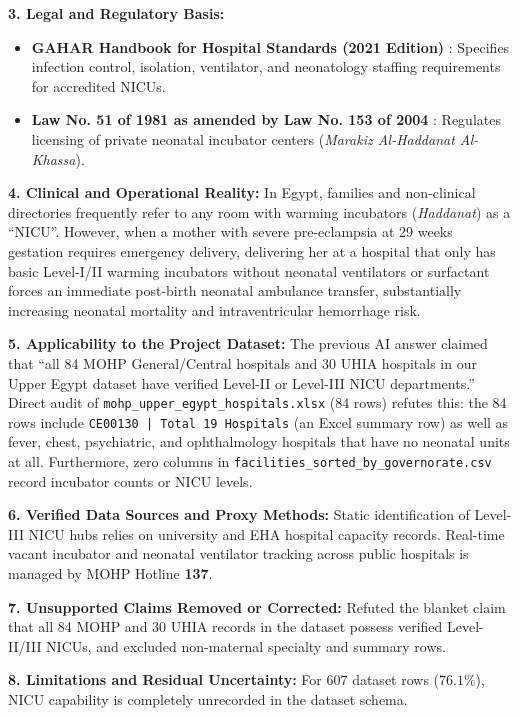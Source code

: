 \documentclass[10pt,a4paper]{article}
\begin{document}
\textbf{3. Legal and Regulatory Basis:}
\begin{itemize}
    \item \textbf{GAHAR Handbook for Hospital Standards (2021 Edition)} \cite{gahar2021hospital}: Specifies infection control, isolation, ventilator, and neonatology staffing requirements for accredited NICUs.
    \item \textbf{Law No. 51 of 1981 as amended by Law No. 153 of 2004} \cite{egypt_law_51_1981_153_2004}: Regulates licensing of private neonatal incubator centers (\textit{Marakiz Al-Haddanat Al-Khassa}).
\end{itemize}

\textbf{4. Clinical and Operational Reality:}
In Egypt, families and non-clinical directories frequently refer to any room with warming incubators (\textit{Haddanat}) as a ``NICU''. However, when a mother with severe pre-eclampsia at 29 weeks gestation requires emergency delivery, delivering her at a hospital that only has basic Level-I/II warming incubators without neonatal ventilators or surfactant forces an immediate post-birth neonatal ambulance transfer, substantially increasing neonatal mortality and intraventricular hemorrhage risk.

\textbf{5. Applicability to the Project Dataset:}
The previous AI answer claimed that ``all 84 MOHP General/Central hospitals and 30 UHIA hospitals in our Upper Egypt dataset have verified Level-II or Level-III NICU departments.'' Direct audit of \texttt{mohp\_upper\_egypt\_hospitals.xlsx} ($84$ rows) refutes this: the 84 rows include \texttt{CE00130 | Total 19 Hospitals} (an Excel summary row) as well as fever, chest, psychiatric, and ophthalmology hospitals that have no neonatal units at all. Furthermore, zero columns in \texttt{facilities\_sorted\_by\_governorate.csv} record incubator counts or NICU levels.

\textbf{6. Verified Data Sources and Proxy Methods:}
Static identification of Level-III NICU hubs relies on university and EHA hospital capacity records. Real-time vacant incubator and neonatal ventilator tracking across public hospitals is managed by MOHP Hotline \textbf{137}.

\textbf{7. Unsupported Claims Removed or Corrected:}
Refuted the blanket claim that all 84 MOHP and 30 UHIA records in the dataset possess verified Level-II/III NICUs, and excluded non-maternal specialty and summary rows.

\textbf{8. Limitations and Residual Uncertainty:}
For $607$ dataset rows ($76.1\%$), NICU capability is completely unrecorded in the dataset schema.
\end{document}
